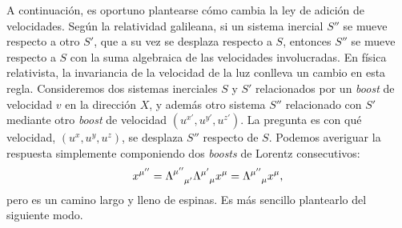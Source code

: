 A continuación, es oportuno plantearse cómo cambia la ley de adición de velocidades. Según la relatividad galileana, si un sistema inercial \(S''\) se mueve respecto a otro \(S'\), que a su vez se desplaza respecto a \(S\), entonces \(S''\) se mueve respecto a \(S\) con la suma algebraica de las velocidades involucradas. En física relativista, la invariancia de la velocidad de la luz conlleva un cambio en esta regla. Consideremos dos sistemas inerciales \(S\) y \(S'\) relacionados por un \textit{boost} de velocidad \(v\) en la dirección \(X\), y además otro sistema \(S''\) relacionado con \(S'\) mediante otro \textit{boost} de velocidad \((u^{x'}, u^{y'}, u^{z'})\). La pregunta es con qué velocidad, \((u^{x}, u^{y}, u^{z})\), se desplaza \(S''\) respecto de \(S\). Podemos averiguar la respuesta simplemente componiendo dos \textit{boosts} de Lorentz consecutivos:
\begin{equation}
    x^{\mu''} = \tensor{\Lambda}{^{\mu''}_{\mu'}}\tensor{\Lambda}{^{\mu'}_{\mu}} x^\mu = \tensor{\Lambda}{^{\mu''}_{\mu}} x^\mu,
\end{equation}
pero es un camino largo y lleno de espinas. Es más sencillo plantearlo del siguiente modo.

